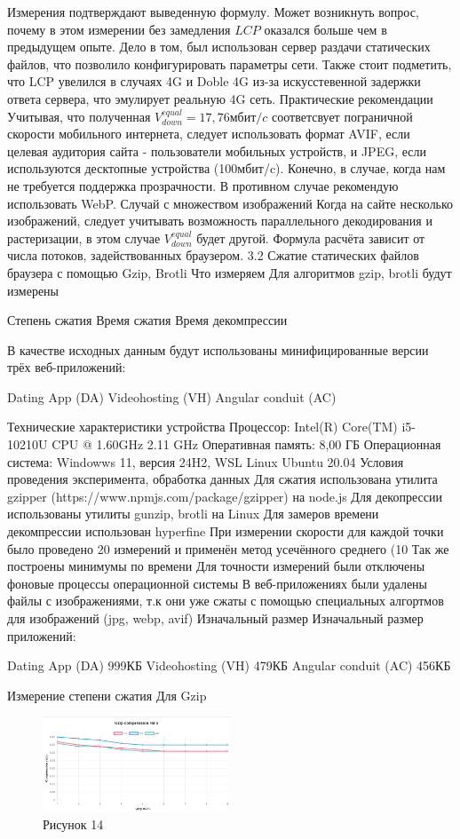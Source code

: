 \documentclass[12pt]{article}
\begin{document}
Измерения подтверждают выведенную формулу. Может возникнуть вопрос, почему в этом измерении без замедления $LCP$ оказался больше чем в предыдущем опыте.
Дело в том, был использован сервер раздачи статических файлов, что позволило конфигурировать параметры сети. Также стоит подметить, что LCP увелился в случаях 4G и Doble 4G из-за искусстевенной задержки ответа сервера, что эмулирует реальную 4G сеть.
Практические рекомендации
Учитывая, что полученная $V^{equal}_{down} = 17,76 мбит/c$ соответсвует пограничной скорости мобильного интернета, следует использовать формат AVIF, если целевая аудитория сайта - пользователи мобильных устройств, и JPEG, если используются десктопные устройства (100мбит/c). Конечно, в случае, когда нам не требуется поддержка прозрачности. В противном случае рекомендую использовать WebP. 
Случай с множеством изображений
Когда на сайте несколько изображений, следует учитывать возможность параллельного декодирования и растеризации, в этом случае $V^{equal}_{down}$ будет другой. Формула расчёта зависит от числа потоков, задействованных браузером.
3.2 Сжатие статических файлов браузера с помощью Gzip, Brotli
Что измеряем
Для алгоритмов gzip, brotli будут измерены

Степень сжатия
Время сжатия
Время декомпрессии

В качестве исходных данным будут использованы минифицированные версии трёх веб-приложений:

Dating App (DA)
Videohosting (VH)
Angular conduit (AC)

Технические характеристики устройства
Процессор: Intel(R) Core(TM) i5-10210U CPU @ 1.60GHz 2.11 GHz
Оперативная память: 8,00 ГБ
Операционная система: Windowws 11, версия 24H2, WSL Linux Ubuntu 20.04
Условия проведения эксперимента, обработка данных
Для сжатия использована утилита gzipper (https://www.npmjs.com/package/gzipper) на node.js
Для декопрессии использованы утилиты gunzip, brotli на Linux
Для замеров времени декомпрессии использован hyperfine
При измерении скорости для каждой точки было проведено 20 измерений и применён метод усечённого среднего (10%
Так же построены минимумы по времени
Для точности измерений были отключены фоновые процессы операционной системы
В веб-приложениях были удалены файлы с изображениями, т.к они уже сжаты с помощью специальных алгортмов для изображений (jpg, webp, avif)
Изначальный размер
Изначальный размер приложений:

Dating App (DA) 999КБ
Videohosting (VH) 479КБ
Angular conduit (AC) 456КБ

Измерение степени сжатия
Для Gzip
\begin{figure}[h!]
\centering
\includegraphics[width=0.5\textwidth]{../images/gzip_compress_ratio.png}
\caption{Рисунок 14}
\end{figure}
\end{document}

